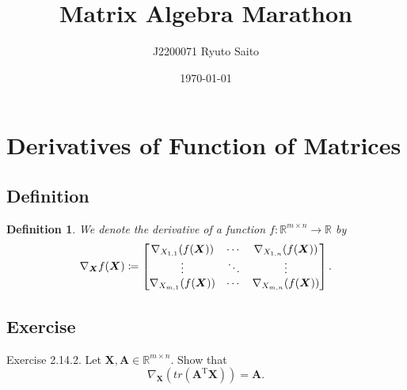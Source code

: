 \documentclass{article}
\title{Matrix Algebra Marathon}
\author{J2200071 Ryuto Saito}
\date{\today}
\theoremstyle{plain}
\newtheorem{dfn}{Definition}[subsection]
\begin{document}
\maketitle

\section{Derivatives of Function of Matrices}


\subsection{Definition}

\begin{dfn}
	We denote the derivative of a function $f:\mathbb{R}^{m \times n} \rightarrow \mathbb{R}$ by
	\begin{equation*}
		\nabla_{\bm{X}} f(\bm{X}) \coloneq
		\begin{bmatrix}
			\nabla_{X_{1,1}} (f(\bm{X})) & \cdots & \nabla_{X_{1,n}} (f(\bm{X})) \\
			\vdots & \ddots & \vdots \\
			\nabla_{X_{m,1}} (f(\bm{X})) & \cdots & \nabla_{X_{m,n}} (f(\bm{X}))
		\end{bmatrix} . \\
	\end{equation*}
\end{dfn}


\subsection{Exercise}


\begin{itembox}[l]{Exercise 2.14.2.}
	Let
	\begin{math}
		\bm{X} , \bm{A} \in \mathbb{R}^{m \times n} .
	\end{math}
	Show that
	\begin{equation}
		\nabla_{\bm{X}} (tr(\bm{A}^{\mathrm{T}} \bm{X})) = \bm{A} .
	\end{equation}
\end{itembox}
\end{document}
